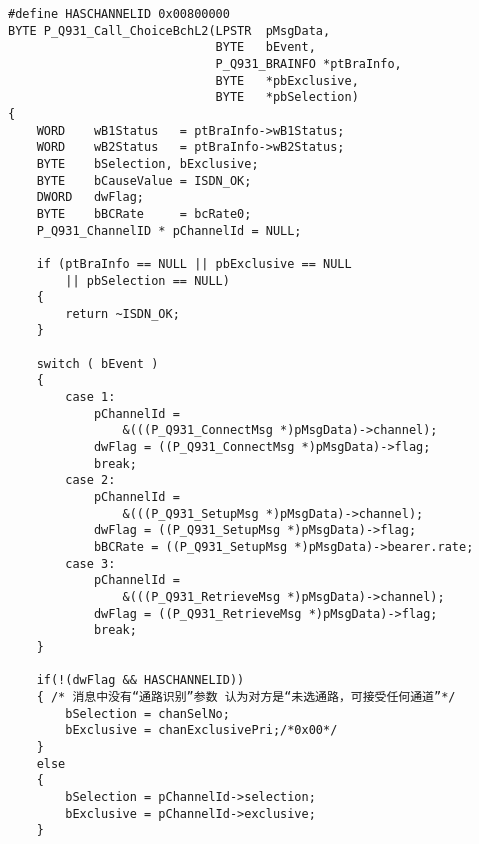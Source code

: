 ﻿\documentclass  [11pt,onecolumn]{article}
\begin{document}
\begin{lstlisting}
#define HASCHANNELID 0x00800000
BYTE P_Q931_Call_ChoiceBchL2(LPSTR  pMsgData,
                             BYTE   bEvent,
                             P_Q931_BRAINFO *ptBraInfo,
                             BYTE   *pbExclusive,
                             BYTE   *pbSelection)
{
    WORD    wB1Status   = ptBraInfo->wB1Status;
    WORD    wB2Status   = ptBraInfo->wB2Status;
    BYTE    bSelection, bExclusive;
    BYTE    bCauseValue = ISDN_OK;
    DWORD   dwFlag;
    BYTE    bBCRate     = bcRate0;
    P_Q931_ChannelID * pChannelId = NULL;
    
    if (ptBraInfo == NULL || pbExclusive == NULL
        || pbSelection == NULL)
    {
        return ~ISDN_OK;
    }

    switch ( bEvent )
    {
        case 1:    
            pChannelId =
                &(((P_Q931_ConnectMsg *)pMsgData)->channel);
            dwFlag = ((P_Q931_ConnectMsg *)pMsgData)->flag;
            break;
        case 2:
            pChannelId =
                &(((P_Q931_SetupMsg *)pMsgData)->channel);
            dwFlag = ((P_Q931_SetupMsg *)pMsgData)->flag;
            bBCRate = ((P_Q931_SetupMsg *)pMsgData)->bearer.rate;
        case 3:    
            pChannelId =
                &(((P_Q931_RetrieveMsg *)pMsgData)->channel);
            dwFlag = ((P_Q931_RetrieveMsg *)pMsgData)->flag;
            break;
    }
    
    if(!(dwFlag && HASCHANNELID))
    { /* 消息中没有“通路识别”参数 认为对方是“未选通路，可接受任何通道”*/
        bSelection = chanSelNo;
        bExclusive = chanExclusivePri;/*0x00*/
    }
    else
    {
        bSelection = pChannelId->selection;
        bExclusive = pChannelId->exclusive;
    }


\end{lstlisting}
\end{document}
